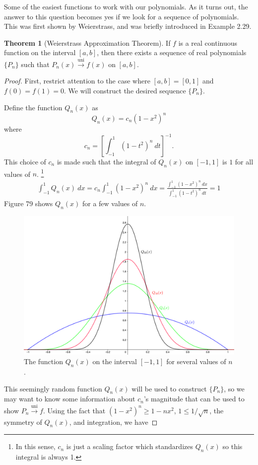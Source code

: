 \documentclass{article}
\newcommand{\uni}{\overset{\text{uni}}{\to}}
\theoremstyle{definition}
\newtheorem{theorem}{Theorem}[section]
\begin{document}
Some of the easiest functions to work with our polynomials. As it turns out, the answer to this question becomes yes if we look for a sequence of polynomials. This was first shown by Weierstrass, and was briefly introduced in Example 2.29. 
\begin{theorem}[Weierstrass Approximation Theorem]
	If $ f $ is a real continuous function on the interval $ [a,b] $, then there exists a sequence of real polynomials $ \{P_n\} $ such that $ P_n(x)\uni f(x) $ on $ [a,b] $. 
\end{theorem}
\begin{proof}
	First, restrict attention to the case where $ [a,b]=[0,1] $ and $ f(0)=f(1)=0 $. We will construct the desired sequence $ \{P_n\} $. 
	
	Define the function $ Q_n(x) $ as $$Q_n(x)=c_n(1-x^2)^n $$ where $$ c_n=\left[\int_{-1}^{1} (1-t^2)^n\ dt\right]^{-1}.$$ This choice of $ c_n $ is made such that the integral of $ Q_n(x) $ on $ [-1,1] $ is $ 1 $ for all values of $ n $. \footnote{In this sense, $ c_n $ is just a scaling factor which standardizes $ Q_n(x) $ so this integral is always 1.}
	\begin{align}
		\int_{-1}^{1}Q_n(x)\ dx=c_n\int_{-1}^{1}(1-x^2)^n\ dx=\frac{\int_{-1}^{1} (1-x^2)^n\ dx}{\int_{-1}^{1} (1-t^2)^n\ dt}=1
	\end{align}
	Figure 79 shows $ Q_n(x) $ for a few values of $ n $. 
	\begin{figure}[h!]
		\centering
		\includegraphics[width=0.9\linewidth]{figures/landau_kern}
		\caption{The function $ Q_n(x) $ on the interval $ [-1,1] $ for several values of $ n $.}
		\label{fig:landaukern}
	\end{figure}
This seemingly random function $ Q_n(x) $ will be used to construct $ \{P_n\} $, so we may want to know some information about $c_n$'s magnitude that can be used to show $ P_n\uni f $. Using the fact that $ (1-x^2)^n\ge1-nx^2 $, $ 1\le 1/\sqrt{n} $, the symmetry of $ Q_n(x) $, and integration, we have 

\end{proof}
\end{document}
